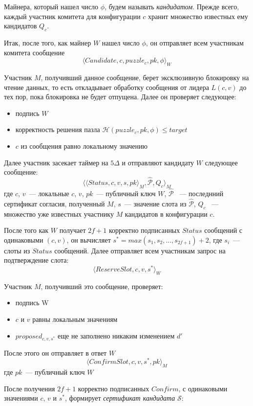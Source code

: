 Майнера, который нашел число $\phi$, будем называть \textit{кандидатом}.
Прежде всего, каждый участник комитета для конфигурации $c$ хранит множество известных ему кандидатов $Q_c$.
\vspace{10pt}

Итак, после того, как майнер $W$ нашел число $\phi$, он отправляет всем участникам комитета сообщение
 \[ \langle Candidate, c, puzzle_c, pk, \phi \rangle_W \]
 
Участник $M$, получивший данное сообщение, берет эксклюзивную блокировку на чтение данных, то есть откладывает обработку сообщения от лидера $L(c, v)$ до тех пор, пока блокировка не будет отпущена. Далее он проверяет следующее:
\begin{itemize}
\item подпись $W$ 
\item корректность решения пазла $\mathcal{H}(puzzle_c, pk, \phi) \le target$
\item $c$ из сообщения равно локальному значению
\end{itemize}

Далее участник засекает таймер на $5\Delta$ и отправляют кандидату $W$ следующее сообщение:
 \[ \langle \langle Status, c, v, s, pk \rangle_M , \hat{\mathcal{P}}, Q_c \rangle_M \]
где $c$, $v$~--- локальные  $c$, $v$, $pk$~--- публичный ключ $W$, $\hat{\mathcal{P}}$ ~--- последнний сертификат согласия, полученный $M$, $s$~--- значение слота из $\hat{\mathcal{P}}$,
$Q_c$ ~--- множество уже известных участнику $M$ кандидатов в конфигурации $c$.
\vspace{10pt}

После того как $W$ получает $2f+1$ корректно подписанных $Status$ сообщений с одинаковыми $(c, v)$, он вычисляет $s^{*}=max(s_1, s_2,..., s_{2f+1})+2$, где $s_i$~--- слоты из $Status$ сообщений.
Далее отправляет всем участникам запрос на подтверждение слота:
 \[ \langle ReserveSlot, c, v, s^{*} \rangle_W \]
 
Участник $M$, получивший это сообщение, проверяет:
\begin{itemize}
\item подпись W
\item $c$ и $v$ равны локальным значениям
\item $proposed_{c, v, s^{*}}$ еще не заполнено никаким изменением $d'$
\end{itemize} 
После этого он отправляет в ответ $W$
 \[ \langle ConfirmSlot, c, v, s^{*}, pk \rangle_M \]
где $pk$~--- публичный ключ $W$

После получения $2f+1$ корректно подписанных $Confirm$, с одинаковыми значениями $c$, $v$ и $s^{*}$,
формирует \textit{сертификат кандидата} $\mathcal{S}$:

